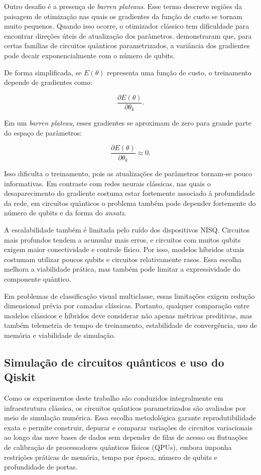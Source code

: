 \documentclass[
    12pt,
    openright,
    oneside,
    a4paper,
    english,
    brazil
]{abntex2}
\begin{document}
Outro desafio é a presença de \textit{barren plateaus}. Esse termo descreve regiões da paisagem de otimização nas quais os gradientes da função de custo se tornam muito pequenos. Quando isso ocorre, o otimizador clássico tem dificuldade para encontrar direções úteis de atualização dos parâmetros.  demonstraram que, para certas famílias de circuitos quânticos parametrizados, a variância dos gradientes pode decair exponencialmente com o número de qubits.

De forma simplificada, se \(E(\theta)\) representa uma função de custo, o treinamento depende de gradientes como:

\[
\frac{\partial E(\theta)}{\partial \theta_k}.
\]

Em um \textit{barren plateau}, esses gradientes se aproximam de zero para grande parte do espaço de parâmetros:

\[
\frac{\partial E(\theta)}{\partial \theta_k}
\approx 0.
\]

Isso dificulta o treinamento, pois as atualizações de parâmetros tornam-se pouco informativas. Em contraste com redes neurais clássicas, nas quais o desaparecimento do gradiente costuma estar fortemente associado à profundidade da rede, em circuitos quânticos o problema também pode depender fortemente do número de qubits e da forma do \textit{ansatz}.

A escalabilidade também é limitada pelo ruído dos dispositivos NISQ. Circuitos mais profundos tendem a acumular mais erros, e circuitos com muitos qubits exigem maior conectividade e controle físico. Por isso, modelos híbridos atuais costumam utilizar poucos qubits e circuitos relativamente rasos. Essa escolha melhora a viabilidade prática, mas também pode limitar a expressividade do componente quântico.

Em problemas de classificação visual multiclasse, essas limitações exigem redução dimensional prévia por camadas clássicas. Portanto, qualquer comparação entre modelos clássicos e híbridos deve considerar não apenas métricas preditivas, mas também telemetria de tempo de treinamento, estabilidade de convergência, uso de memória e viabilidade de simulação.

\subsection{Simulação de circuitos quânticos e uso do Qiskit}
\label{subsec:simulacao_circuitos_qiskit}

Como os experimentos deste trabalho são conduzidos integralmente em infraestrutura clássica, os circuitos quânticos parametrizados são avaliados por meio de simulação numérica. Essa escolha metodológica garante reprodutibilidade exata e permite construir, depurar e comparar variações de circuitos variacionais ao longo das nove bases de dados sem depender de filas de acesso ou flutuações de calibração de processadores quânticos físicos (QPUs), embora imponha restrições práticas de memória, tempo por época, número de qubits e profundidade de portas.
\end{document}
